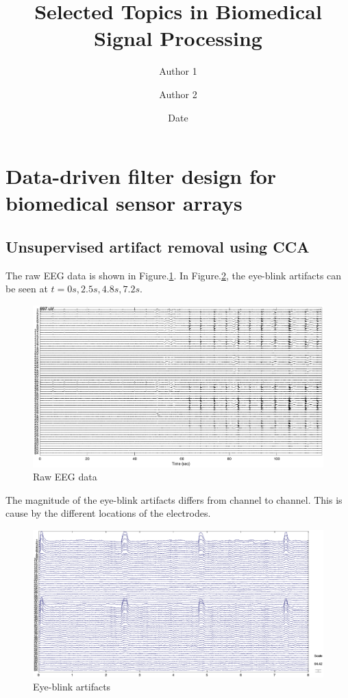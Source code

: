 \documentclass[pagesize,english,DIV=calc,footinclude=false
]{scrartcl}
\title{Selected Topics in Biomedical Signal Processing}
\author{Author 1 \and Author 2}
\date{Date}
\begin{document}
\maketitle

\section{Data-driven filter design for biomedical sensor arrays}

\subsection{Unsupervised artifact removal using CCA}

The raw EEG data is shown in Figure.\ref{fig:raw_eeg}. In Figure.\ref{fig:arti_zoom}, the eye-blink artifacts can be seen at $t=0s, 2.5s, 4.8s, 7.2s$. 

\begin{figure}[htbp]
  \centering
  \includegraphics[width=\linewidth]{eeg_raw.eps}
  \caption{Raw EEG data}
  \label{fig:raw_eeg}
\end{figure}

The magnitude of the eye-blink artifacts differs from channel to channel. This is cause by the different locations of the electrodes.

\begin{figure}[htbp]
  \centering
  \includegraphics[width=\linewidth]{arti.eps}
  \caption{Eye-blink artifacts}
  \label{fig:arti_zoom}
\end{figure}
\end{document}
